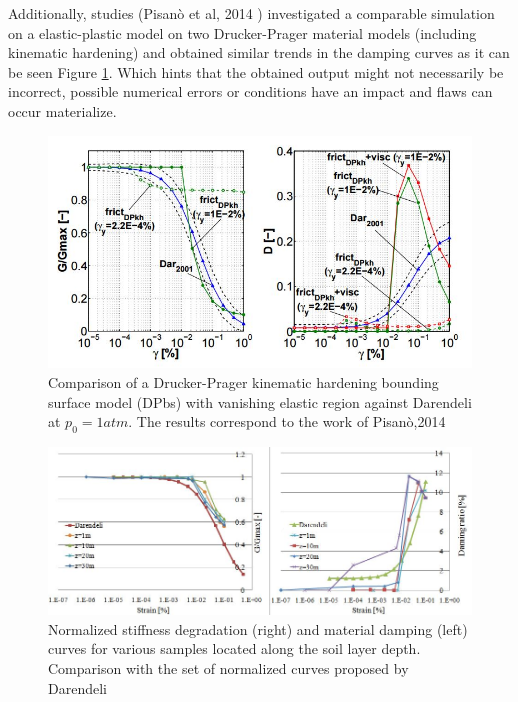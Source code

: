 \documentclass[12pt,a4paper]{report}
\begin{document}
Additionally, studies (Pisan\`{o} et al, 2014 \cite{papadrakakiscomparison}) investigated a comparable simulation on a elastic-plastic model on two Drucker-Prager material models (including kinematic hardening) and obtained similar trends in the damping curves as it can be seen Figure \ref{pisano}. Which hints that the obtained output might not necessarily be incorrect, possible numerical errors or conditions have an impact and flaws can occur materialize. 

\begin{figure}[!h]
	\centering
	\includegraphics[width=0.9 \linewidth]{pisano}
	\caption{Comparison of a Drucker-Prager kinematic hardening bounding surface model (DPbs) with vanishing elastic region against Darendeli at $p_0=1 atm$. The results correspond to the work of Pisan\`{o},2014 \cite{pisano2014simulating}}
	\label{pisano}
\end{figure}

\begin{figure}[!h]
	\centering
	\includegraphics[width=0.9 \linewidth]{ggmax}
	\caption{Normalized stiffness degradation (right) and material damping (left) curves for various samples located along the soil layer depth. Comparison with the set of \mbox{normalized} curves proposed by Darendeli}
	\label{ggmaxi}
\end{figure}

\end{document}
